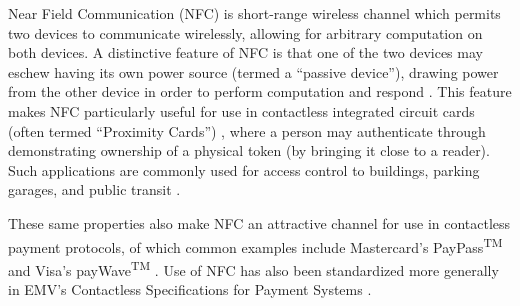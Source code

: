 Near Field Communication (NFC) is short-range wireless channel which permits two devices to communicate wirelessly,
    allowing for arbitrary computation on both devices.
A distinctive feature of NFC is that one of the two devices may eschew having its own power source (termed a ``passive device''),
    drawing power from the other device in order to perform computation and respond \cite{nfcspec}.
This feature makes NFC particularly useful for use in contactless integrated circuit cards (often termed ``Proximity Cards'') \cite{nfciso},
    where a person may authenticate through demonstrating ownership of a physical token (by bringing it close to a reader).
Such applications are commonly used for access control to buildings, parking garages, and public transit \cite{finvzgar2011use, roberts2006radio, tamrakar2011identity, weinstein2005rfid}.

These same properties also make NFC an attractive channel for use in contactless payment protocols,
    of which common examples include Mastercard's PayPass\textsuperscript{TM} \cite{paypass} and Visa's payWave\textsuperscript{TM} \cite{paywave}.
Use of NFC has also been standardized more generally in EMV's Contactless Specifications for Payment Systems \cite{emv}.
